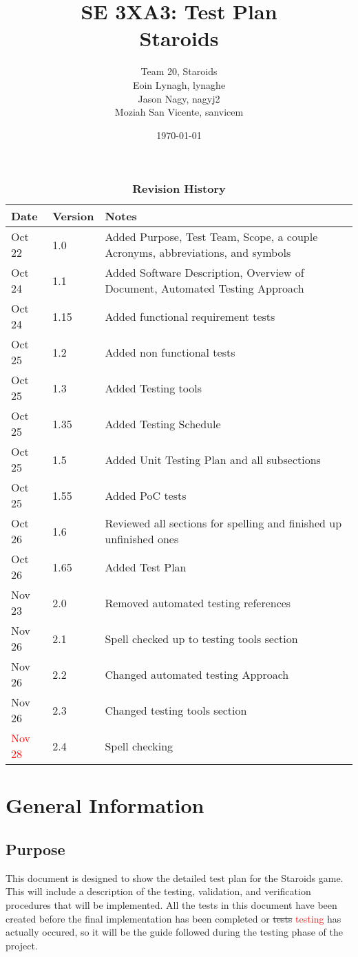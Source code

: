 \documentclass[12pt, titlepage]{article}
\title{SE 3XA3: Test Plan\\Staroids}
\author{Team 20, Staroids
		\\ Eoin Lynagh, lynaghe
		\\ Jason Nagy, nagyj2
		\\ Moziah San Vicente, sanvicem
}
\date{\today}
\begin{document}
\maketitle

\tableofcontents
\listoftables
\listoffigures

\begin{table}[h]
\caption{\bf Revision History}
\begin{tabularx}{\textwidth}{p{3cm}p{2cm}X}
\toprule {\bf Date} & {\bf Version} & {\bf Notes}\\
\midrule
Oct 22 & 1.0 & Added Purpose, Test Team, Scope, a couple Acronyms, abbreviations, and symbols\\
Oct 24 & 1.1 & Added Software Description, Overview of Document, Automated Testing Approach\\
Oct 24 & 1.15 & Added functional requirement tests\\
Oct 25 & 1.2 & Added non functional tests\\
Oct 25 & 1.3 & Added Testing tools\\
Oct 25 & 1.35 & Added Testing Schedule\\
Oct 25 & 1.5 & Added Unit Testing Plan and all subsections\\
Oct 25 & 1.55 & Added PoC tests\\
Oct 26 & 1.6 & Reviewed all sections for spelling and finished up unfinished ones\\
Oct 26 & 1.65 & Added Test Plan\\
Nov 23 & 2.0 & Removed automated testing references\\
Nov 26 & 2.1 & Spell checked up to testing tools section\\
Nov 26 & 2.2 & Changed automated testing Approach\\
Nov 26 & 2.3 & Changed testing tools section\\
\textcolor{red}{Nov 28} & 2.4 & Spell checking\\
\bottomrule
\end{tabularx}
\end{table}

\newpage


\section{General Information}

\subsection{Purpose}
This document is designed to show the detailed test plan for the Staroids game. This will include a description of the testing, validation, and verification procedures that will be implemented. All the tests in this document have been created before the final implementation has been completed or \sout{tests} \textcolor{red}{testing} has actually occured, so it will be the guide followed during the testing phase of the project.
\end{document}
